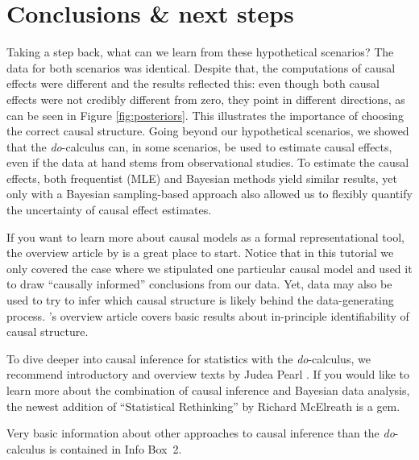 \documentclass[nobib]{tufte-handout}
\newcommand{\docalc}{\emph{do}-calculus\xspace}
\begin{document}
\section{Conclusions \& next steps}
\label{sec:conclusions--next}

Taking a step back, what can we learn from these hypothetical scenarios?
The data for both scenarios was identical.
Despite that, the computations of causal effects were different and the results reflected this: even though both causal effects were not credibly different from zero, they point in different directions, as can be seen in Figure \ref{fig:posteriors}.
This illustrates the importance of choosing the correct causal structure. 
Going beyond our hypothetical scenarios, we showed that the \docalc can, in some scenarios, be used to estimate causal effects, even if the data at hand stems from observational studies.
To estimate the causal effects, both frequentist (MLE) and Bayesian methods yield similar results, yet only with a Bayesian sampling-based approach also allowed us to flexibly quantify the uncertainty of causal effect estimates.

If you want to learn more about causal models as a formal representational tool, the overview article by \citet{sep-causal-models} is a great place to start.
Notice that in this tutorial we only covered the case where we stipulated one particular causal model and used it to draw ``causally informed'' conclusions from our data.
Yet, data may also be used to try to infer which causal structure is likely behind the data-generating process.
\citeauthor{sep-causal-models}'s overview article covers basic results about in-principle identifiability of causal structure.

To dive deeper into causal inference for statistics with the \docalc, we recommend introductory and overview texts by Judea Pearl \citep{pearl2009causal,2016:Pearl-Judea-and}.
If you would like to learn more about the combination of causal inference and Bayesian data analysis, the newest addition of ``Statistical Rethinking'' by Richard McElreath is a gem.

Very basic information about other approaches to causal inference than the \docalc is contained in Info Box~2.
\end{document}
